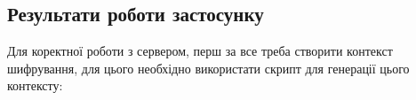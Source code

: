 \subsection{Результати роботи застосунку}

Для коректної роботи з сервером, перш за все треба створити контекст шифрування, для
цього необхідно використати скрипт для генерації цього контексту:





